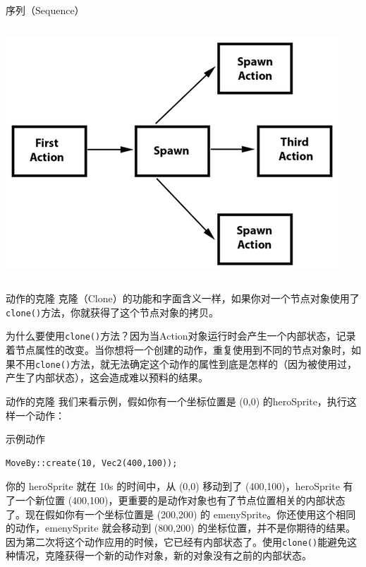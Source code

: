 \documentclass{beamer}
\begin{document}
\begin{frame}[fragile]{序列（Sequence）}
\begin{columns}
\begin{column}{0.3\textwidth}
\vspace{1em}

\includegraphics[width=\textwidth]
{figures/spawn_in_sequence}
\end{column}
\end{columns}
\end{frame}


\begin{frame}[fragile]{动作的克隆}
克隆（Clone）的功能和字面含义一样，如果你对一个节点对象使用了\texttt{clone()}方法，你就获得了这个节点对象的拷贝。

\vspace{1em}

为什么要使用\texttt{clone()}方法？因为当Action对象运行时会产生一个内部状态，记录着节点属性的改变。当你想将一个创建的动作，重复使用到不同的节点对象时，如果不用\texttt{clone()}方法，就无法确定这个动作的属性到底是怎样的（因为被使用过，产生了内部状态），这会造成难以预料的结果。
\end{frame}


\begin{frame}[fragile]{动作的克隆}
我们来看示例，假如你有一个坐标位置是 (0,0) 的heroSprite，执行这样一个动作：

\vspace{1em}

\begin{block}{示例动作}
\begin{verbatim}
MoveBy::create(10, Vec2(400,100));
\end{verbatim}
\end{block}

\vspace{1em}

你的 heroSprite 就在 10s 的时间中，从 (0,0) 移动到了 (400,100)，heroSprite 有了一个新位置 (400,100)，更重要的是动作对象也有了节点位置相关的内部状态了。现在假如你有一个坐标位置是 (200,200) 的 emenySprite。你还使用这个相同的动作，emenySprite 就会移动到 (800,200) 的坐标位置，并不是你期待的结果。因为第二次将这个动作应用的时候，它已经有内部状态了。使用\texttt{clone()}能避免这种情况，克隆获得一个新的动作对象，新的对象没有之前的内部状态。
\end{frame}
\end{document}
